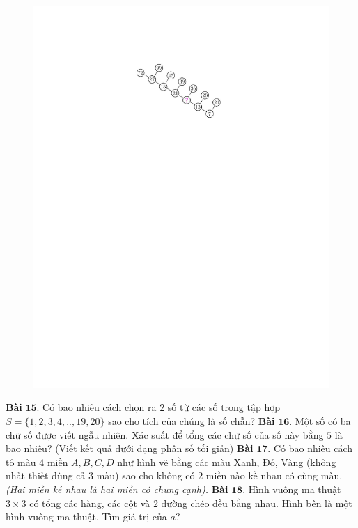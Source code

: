 \begin{multicols}{2}
\begin{figure}[H]
		\includegraphics[width= 1\linewidth]{bai14k3}
		\vspace*{-10pt}
	\end{figure}
	\textbf{\color{toancuabi}Bài} $\pmb{15.}$ Có bao nhiêu cách chọn ra $2$ số từ các số trong tập hợp $S=\{1,2,3,4,..,19,20\}$ sao cho tích của chúng là số chẵn?
	\vskip 0.1cm
	\textbf{\color{toancuabi}Bài} $\pmb{16.}$  Một số có ba chữ số được viết ngẫu nhiên. Xác suất để tổng các chữ số của số này bằng $5$ là bao nhiêu? (Viết kết quả dưới dạng phân số tối giản)
	\vskip 0.1cm
	\textbf{\color{toancuabi}Bài} $\pmb{17.}$  Có bao nhiêu cách tô màu $4$ miền $A,B,C,D$ như hình vẽ bằng các màu Xanh, Đỏ, Vàng (không nhất thiết dùng cả $3$ màu) sao cho không có $2$ miền nào kề nhau có cùng màu.
	\vskip 0.1cm
	\textit{(Hai miền kề nhau là hai miền có chung cạnh).}
	\vskip 0.1cm
	\textbf{\color{toancuabi}Bài} $\pmb{18.}$ Hình vuông ma thuật $3\times 3$ có tổng các hàng, các cột và $2$ đường chéo đều bằng nhau. Hình bên là một hình vuông ma thuật. Tìm giá trị của $a$?
	\begin{figure}[H]

\end{figure}
\end{multicols}
